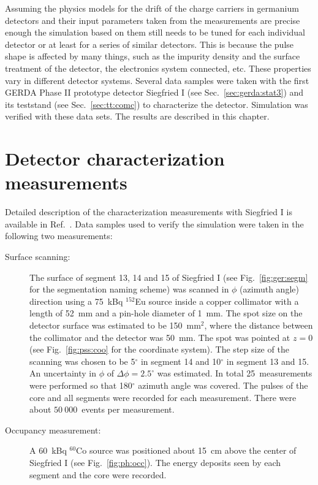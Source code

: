 Assuming the physics models\cite{miha, bart} for the drift of the charge carriers in germanium detectors and their input parameters taken from the measurements\cite{miha, bart} are precise enough the simulation based on them still needs to be tuned for each individual detector or at least for a series of similar detectors. This is because the pulse shape is affected by many things, such as the impurity density and the surface treatment of the detector, the electronics system connected, etc. These properties vary in different detector systems. Several data samples were taken with the first GERDA Phase II prototype detector Siegfried I (see Sec.~\ref{sec:gerda:stat3}) and its teststand (see Sec.~\ref{sec:tt:comc}) to characterize the detector. Simulation was verified with these data sets. The results are described in this chapter.

\section{Detector characterization measurements}
\label{sec:psa:char}
Detailed description of the characterization measurements with Siegfried I is available in Ref.~\cite{Sie07}. Data samples used to verify the simulation were taken in the following two measurements:
\begin{description}
\item[Surface scanning:] The surface of segment 13, 14 and 15 of Siegfried I (see Fig.~\ref{fig:ger:segm} for the segmentation naming scheme) was scanned in $\phi$ (azimuth angle) direction using a 75~kBq $^{152}$Eu source inside a copper collimator with a length of 52~mm and a pin-hole diameter of 1~mm. The spot size on the detector surface was estimated to be 150~mm$^{2}$, where the distance between the collimator and the detector was 50~mm. The spot was pointed at $z = 0$ (see Fig.~\ref{fig:pss:coo} for the coordinate system). The step size of the scanning was chosen to be 5$^{\circ}$ in segment 14 and 10$^{\circ}$ in segment 13 and 15. An uncertainty in $\phi$ of $\Delta \phi=2.5^{\circ}$ was estimated. In total 25~measurements were performed so that 180$^{\circ}$ azimuth angle was covered. The pulses of the core and all segments were recorded for each measurement. There were about $50\ 000$~events per measurement.
\item[Occupancy measurement:] A 60~kBq $^{60}$Co source was positioned about 15~cm above the center of Siegfried I (see Fig.~\ref{fig:ph:occ}). The energy deposits seen by each segment and the core were recorded.
\end{description}

